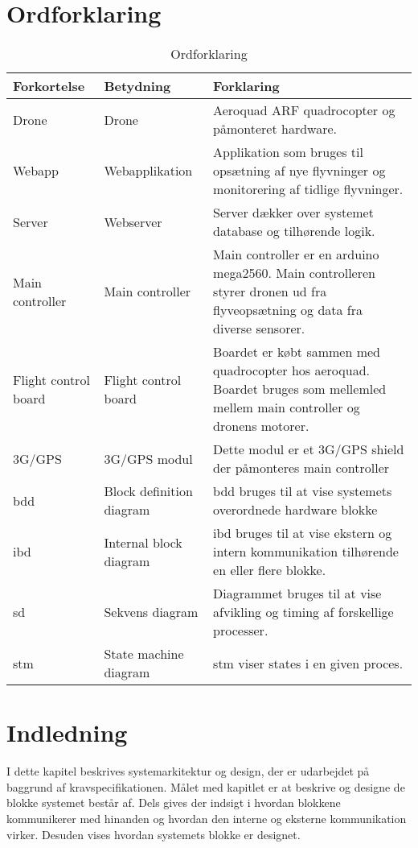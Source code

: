 \section{Ordforklaring}
\begin{table}[H]
	\centering
		\begin{tabular}{|p{2.6cm}|p{4.5 cm}|p{6.5 cm}|} 
		\hline
			\textbf{Forkortelse} & \textbf{Betydning} & \textbf{Forklaring} \\ \hline
			 Drone & Drone & Aeroquad ARF quadrocopter og \newline påmonteret hardware. \\ \hline
			 Webapp & Webapplikation & Applikation som bruges til opsætning af nye flyvninger og monitorering af tidlige flyvninger. \\ \hline
			 Server & Webserver & Server dækker over systemet database og tilhørende logik. \\ \hline
			 Main controller & Main controller  & Main controller er en arduino mega2560. Main controlleren styrer dronen ud fra flyveopsætning og data fra diverse sensorer.   \\ \hline
			 Flight control \newline board & Flight control board  & Boardet er købt sammen med quadrocopter hos aeroquad. Boardet bruges som mellemled mellem main controller og dronens motorer.  \\ \hline
			 3G/GPS & 3G/GPS modul  & Dette modul er et 3G/GPS shield der påmonteres main controller  \\ \hline			 
			 
			 bdd& Block definition diagram  & bdd bruges til at vise systemets overordnede hardware blokke  \\ \hline
			 ibd& Internal block diagram & ibd bruges til at vise ekstern og intern kommunikation tilhørende en eller flere blokke. \\ \hline
			 sd& Sekvens diagram & Diagrammet bruges til at vise afvikling og timing af forskellige processer. \\ \hline
			 stm& State machine diagram & stm viser states i en given proces. \\ \hline
		\end{tabular}
	\caption{Ordforklaring}
\end{table}

\vspace{3.5cm}

\section{Indledning}
I dette kapitel beskrives systemarkitektur og design, der er udarbejdet på baggrund af kravspecifikationen. Målet med kapitlet er at beskrive og designe de blokke systemet består af. Dels gives der indsigt i hvordan blokkene kommunikerer med hinanden og hvordan den interne og eksterne kommunikation virker. Desuden vises hvordan systemets blokke er designet. 